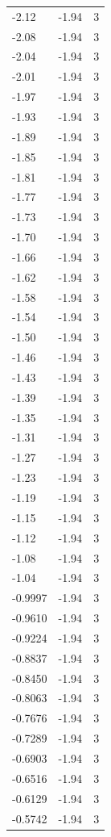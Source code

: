 \begin{longtable}{lrr}
  -2.12 & -1.94 & 3 \\
  -2.08 & -1.94 & 3 \\
  -2.04 & -1.94 & 3 \\
  -2.01 & -1.94 & 3 \\
  -1.97 & -1.94 & 3 \\
  -1.93 & -1.94 & 3 \\
  -1.89 & -1.94 & 3 \\
  -1.85 & -1.94 & 3 \\
  -1.81 & -1.94 & 3 \\
  -1.77 & -1.94 & 3 \\
  -1.73 & -1.94 & 3 \\
  -1.70 & -1.94 & 3 \\
  -1.66 & -1.94 & 3 \\
  -1.62 & -1.94 & 3 \\
  -1.58 & -1.94 & 3 \\
  -1.54 & -1.94 & 3 \\
  -1.50 & -1.94 & 3 \\
  -1.46 & -1.94 & 3 \\
  -1.43 & -1.94 & 3 \\
  -1.39 & -1.94 & 3 \\
  -1.35 & -1.94 & 3 \\
  -1.31 & -1.94 & 3 \\
  -1.27 & -1.94 & 3 \\
  -1.23 & -1.94 & 3 \\
  -1.19 & -1.94 & 3 \\
  -1.15 & -1.94 & 3 \\
  -1.12 & -1.94 & 3 \\
  -1.08 & -1.94 & 3 \\
  -1.04 & -1.94 & 3 \\
  -0.9997 & -1.94 & 3 \\
  -0.9610 & -1.94 & 3 \\
  -0.9224 & -1.94 & 3 \\
  -0.8837 & -1.94 & 3 \\
  -0.8450 & -1.94 & 3 \\
  -0.8063 & -1.94 & 3 \\
  -0.7676 & -1.94 & 3 \\
  -0.7289 & -1.94 & 3 \\
  -0.6903 & -1.94 & 3 \\
  -0.6516 & -1.94 & 3 \\
  -0.6129 & -1.94 & 3 \\
  -0.5742 & -1.94 & 3 \\

\end{longtable}

